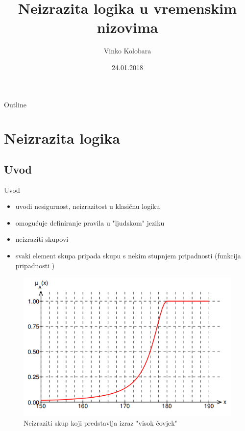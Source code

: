 \documentclass{beamer}
\title[Your Short Title]{Neizrazita logika u vremenskim nizovima}
\author{Vinko Kolobara}
\institute{Fakultet Elektrotehnike i Računarstva, Zagreb}
\date{24.01.2018}
\begin{document}
\begin{frame}
  \titlepage
\end{frame}

\begin{frame}{Outline}
  \tableofcontents
\end{frame}


\section{Neizrazita logika}

\subsection{Uvod}
\begin{frame}{Uvod}

\begin{itemize}
  \item uvodi nesigurnost, neizrazitost u klasičnu logiku
  \item omogućuje definiranje pravila u "ljudskom" jeziku
  \item neizraziti skupovi
  \item svaki element skupa pripada skupu s nekim stupnjem pripadnosti (funkcija pripadnosti )
\end{itemize}

\end{frame}

\begin{frame}{}
\begin{figure}[h]
  \includegraphics[width=\textwidth]{img/fuzzy_tall.png}
  \caption{Neizraziti skup koji predstavlja izraz "visok čovjek"}
\end{figure}
\end{frame}
\end{document}
